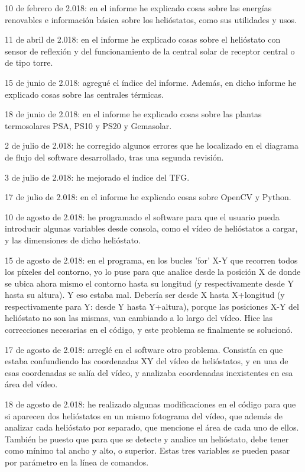 10 de febrero de 2.018: en el informe he explicado cosas sobre las energías renovables e información básica sobre los helióstatos, como sus utilidades y usos.

11 de abril de 2.018: en el informe he explicado cosas sobre el helióstato con sensor de reflexión y del funcionamiento de la central solar de receptor central o de tipo torre.

15 de junio de 2.018: agregué el índice del informe. Además, en dicho informe he explicado cosas sobre las centrales térmicas.

18 de junio de 2.018: en el informe he explicado cosas sobre las plantas termosolares PSA, PS10 y PS20 y Gemasolar.

2 de julio de 2.018: he corregido algunos errores que he localizado en el diagrama de flujo del software desarrollado, tras una segunda revisión.

3 de julio de 2.018: he mejorado el índice del TFG.

17 de julio de 2.018: en el informe he explicado cosas sobre OpenCV y Python.

10 de agosto de 2.018: he programado el software para que el usuario pueda introducir algunas variables desde consola, como el vídeo de helióstatos a cargar, y las dimensiones de dicho helióstato.

15 de agosto de 2.018: en el programa, en los bucles 'for' X-Y que recorren todos los píxeles del contorno, yo lo puse para que analice desde la posición X de donde se ubica ahora mismo el contorno hasta su longitud (y respectivamente desde Y hasta su altura). Y eso estaba mal. Debería ser desde X hasta X+longitud (y respectivamente para Y: desde Y hasta Y+altura), porque las posiciones X-Y del helióstato no son las mismas, van cambiando a lo largo del vídeo. Hice las correcciones necesarias en el código, y este problema se finalmente se solucionó.

17 de agosto de 2.018: arreglé en el software otro problema. Consistía en que estaba confundiendo las coordenadas XY del vídeo de helióstatos, y en una de esas coordenadas se salía del vídeo, y analizaba coordenadas inexistentes en esa área del vídeo.

18 de agosto de 2.018: he realizado algunas modificaciones en el código para que si aparecen dos helióstatos en un mismo fotograma del vídeo, que además de analizar cada helióstato por separado, que mencione el área de cada uno de ellos. También he puesto que para que se detecte y analice un helióstato, debe tener como mínimo tal ancho y alto, o superior. Estas tres variables se pueden pasar por parámetro en la línea de comandos.

